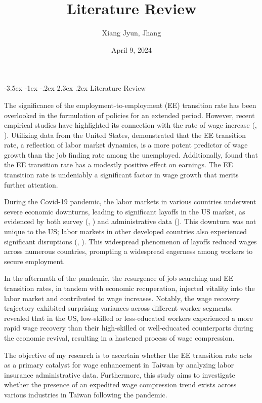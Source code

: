 \documentclass[11pt]{article}
\title{Literature Review}
\author{Xiang Jyun, Jhang}
\date{April 9, 2024}
\makeatletter
\renewcommand\section{\@startsection {section}{1}{\z@}%
                                       {-3.5ex \@plus -1ex \@minus -.2ex}%
                                       {2.3ex \@plus.2ex}%
                                       {\normalfont\fontfamily{phv}\fontsize{16}{19}\bfseries}}
\makeatother
\begin{document}
		
    \maketitle

    \section{Literature Review} \label{s:sec2}

        The significance of the employment-to-employment (EE) transition rate has been overlooked in the formulation of policies for an extended period. However, recent empirical studies have highlighted its connection with the rate of wage increase (\cite{moscarini2016wage}, \cite{hahnJobtoJobFlowsEarnings2017}). Utilizing data from the United States, \cite{karahanJobtoJobTransitionsDrive2017} demonstrated that the EE transition rate, a reflection of labor market dynamics, is a more potent predictor of wage growth than the job finding rate among the unemployed. Additionally, \cite{hahnJobtoJobFlowsEarnings2017} found that the EE transition rate has a modestly positive effect on earnings. The EE transition rate is undeniably a significant factor in wage growth that merits further attention.

        During the Covid-19 pandemic, the labor markets in various countries underwent severe economic downturns, leading to significant layoffs in the US market, as evidenced by both survey (\cite{coibion2020labor}, \cite{cortes2023heterogeneous}) and administrative data (\cite{albanesi2021effects}). This downturn was not unique to the US; labor markets in other developed countries also experienced significant disruptions (\cite{fana2020employment}, \cite{kikuchi2021suffers}). This widespread phenomenon of layoffs reduced wages across numerous countries, prompting a widespread eagerness among workers to secure employment.

        In the aftermath of the pandemic, the resurgence of job searching and EE transition rates, in tandem with economic recuperation, injected vitality into the labor market and contributed to wage increases. Notably, the wage recovery trajectory exhibited surprising variances across different worker segments. \cite{autorUnexpectedCompressionCompetition2023} revealed that in the US, low-skilled or less-educated workers experienced a more rapid wage recovery than their high-skilled or well-educated counterparts during the economic revival, resulting in a hastened process of wage compression.

        The objective of my research is to ascertain whether the EE transition rate acts as a primary catalyst for wage enhancement in Taiwan by analyzing labor insurance administrative data. Furthermore, this study aims to investigate whether the presence of an expedited wage compression trend exists across various industries in Taiwan following the pandemic.









	
\end{document}
